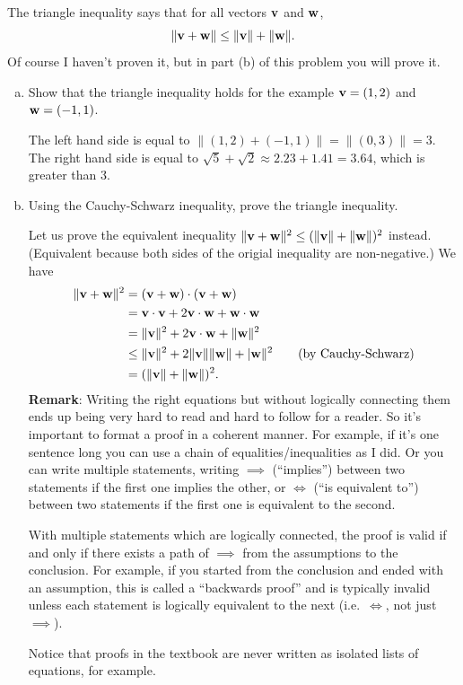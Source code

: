 \begin{problem}
  The triangle inequality says that for all vectors $\mathbf v$ and $\mathbf w$,
  \[\|\mathbf v+\mathbf w\|\leq \|\mathbf v\|+\|\mathbf w\|.\]
  Of course I haven't proven it, but in part (b) of this problem you will prove it.
    \begin{enumerate}[(a)]
      \item Show that the triangle inequality holds for the example $\mathbf v=(1,2)$ and $\mathbf w=(-1,1)$.
      \begin{solution}
        The left hand side is equal to $\|(1,2)+(-1,1)\|=\|(0,3)\|=3$. The right hand side is equal to $\sqrt{5}+\sqrt2\approx 2.23+1.41=3.64$, which is greater than 3.
      \end{solution}
      \item Using the Cauchy-Schwarz inequality, prove the triangle inequality.
      \begin{solution}
        Let us prove the equivalent inequality $\|\mathbf v+\mathbf w\|^2\leq(\|\mathbf v\|+\|\mathbf w\|)^2$ instead. (Equivalent because both sides of the origial inequality are non-negative.) We have
        \[\begin{split}
          \|\mathbf v+\mathbf w\|^2 &= (\mathbf v+\mathbf w)\cdot(\mathbf v+\mathbf w)\\
          &= \mathbf v\cdot\mathbf v+2\mathbf v\cdot\mathbf w+\mathbf w\cdot\mathbf w\\
          &= \|\mathbf v\|^2+2\mathbf v\cdot\mathbf w+\|\mathbf w\|^2\\
          &\leq\|\mathbf v\|^2+2\|\mathbf v\|\|\mathbf w\|+|\mathbf w\|^2\qquad\text{(by Cauchy-Schwarz)} \\
          &=(\|\mathbf v\|+\|\mathbf w\|)^2.
        \end{split}\]
        \textbf{Remark}: Writing the right equations but without logically connecting them ends up being very hard to read and hard to follow for a reader. So it's important to format a proof in a coherent manner. For example, if it's one sentence long you can use a chain of equalities/inequalities as I did. Or you can write multiple statements, writing $\implies$ (``implies'') between two statements if the first one implies the other, or $\iff$ (``is equivalent to'') between two statements if the first one is equivalent to the second.

        With multiple statements which are logically connected, the proof is valid if and only if there exists a path of $\implies$ from the assumptions to the conclusion. For example, if you started from the conclusion and ended with an assumption, this is called a ``backwards proof'' and is typically invalid unless each statement is logically equivalent to the next (i.e.\ $\iff$, not just $\implies$).

        Notice that proofs in the textbook are never written as isolated lists of equations, for example.
      \end{solution}
  \end{enumerate}
\end{problem}

